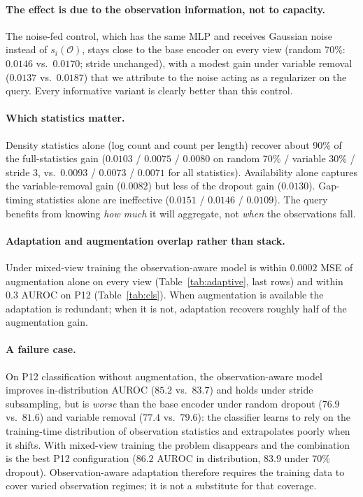 \documentclass[sigconf,nonacm]{acmart}
\begin{document}
\paragraph{The effect is due to the observation information, not to capacity.}
The noise-fed control, which has the same MLP and receives Gaussian noise instead of $s_i(\mathcal O)$, stays
close to the base encoder on every view (random 70\%: $0.0146$ vs.\ $0.0170$; stride unchanged), with a modest
gain under variable removal ($0.0137$ vs.\ $0.0187$) that we attribute to the noise acting as a regularizer on
the query. Every informative variant is clearly better than this control.

\paragraph{Which statistics matter.}
Density statistics alone (log count and count per length) recover about 90\% of the full-statistics gain
($0.0103$ / $0.0075$ / $0.0080$ on random 70\% / variable 30\% / stride 3, vs.\ $0.0093$ / $0.0073$ / $0.0071$
for all statistics). Availability alone captures the variable-removal gain ($0.0082$) but less of the dropout
gain ($0.0130$). Gap-timing statistics alone are ineffective ($0.0151$ / $0.0146$ / $0.0109$). The query benefits
from knowing \emph{how much} it will aggregate, not \emph{when} the observations fall.

\paragraph{Adaptation and augmentation overlap rather than stack.}
Under mixed-view training the observation-aware model is within $0.0002$ MSE of augmentation alone on every view
(Table~\ref{tab:adaptive}, last rows) and within $0.3$ AUROC on P12 (Table~\ref{tab:cls}). When augmentation is
available the adaptation is redundant; when it is not, adaptation recovers roughly half of the augmentation gain.

\paragraph{A failure case.}
On P12 classification without augmentation, the observation-aware model improves in-distribution AUROC
($85.2$ vs.\ $83.7$) and holds under stride subsampling, but is \emph{worse} than the base encoder under random
dropout ($76.9$ vs.\ $81.6$) and variable removal ($77.4$ vs.\ $79.6$): the classifier learns to rely on the
training-time distribution of observation statistics and extrapolates poorly when it shifts. With mixed-view
training the problem disappears and the combination is the best P12 configuration ($86.2$ AUROC in distribution,
$83.9$ under 70\% dropout). Observation-aware adaptation therefore requires the training data to cover varied
observation regimes; it is not a substitute for that coverage.
\end{document}
